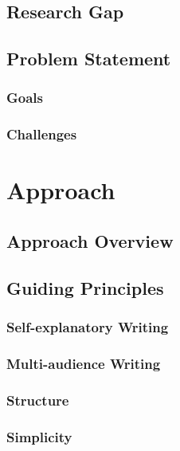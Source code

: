 \documentclass[a4paper]{memoir}
\begin{document}
\section{Research Gap}
\label{sec:research-gap}

\section{Problem Statement}
\label{sec:problem}

\subsection{Goals}
\label{sec:goals}

\subsection{Challenges}
\label{sec:challenges}


\chapter{Approach}
\label{cha:approach}

\section{Approach Overview}
\label{sec:approach-overview}

\section{Guiding Principles}
\label{sec:principles}

\subsection{Self-explanatory Writing}
\label{sec:self}

\subsection{Multi-audience Writing}
\label{sec:multi-audience}

\subsection{Structure}
\label{sec:structuredness}

\subsection{Simplicity}
\label{sec:simplicity}
\end{document}
